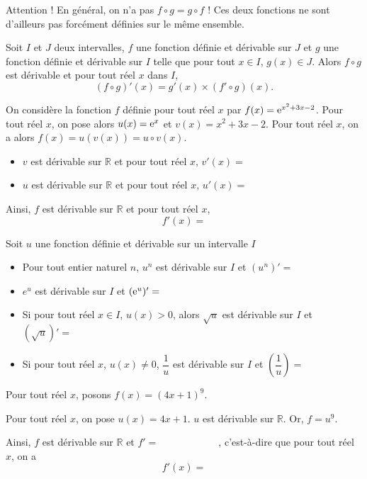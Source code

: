 \documentclass[11pt,fleqn, openany]{book} %
\begin{document}
Attention ! En général, on n'a pas $f \circ g = g \circ f$ ! Ces deux fonctions ne sont d'ailleurs pas forcément définies sur le même ensemble.

\begin{proposition}Soit $I$ et $J$ deux intervalles, $f$ une fonction définie et dérivable sur $J$ et $g$ une fonction définie et dérivable sur $I$ telle que pour tout $x \in I$, $g(x) \in J$. Alors $f \circ g$ est dérivable et pour tout réel $x$ dans $I$,
\[ (f \circ g)' (x)= g'(x) \times (f' \circ g)(x).\]
\vspace{-0.5cm}\end{proposition}



\begin{example}On considère la fonction $f$ définie pour tout réel $x$ par $f(x)=\mathrm{e}^{x^2+3x-2}$. 
Pour tout réel $x$, on pose alors $u(x)=\mathrm{e}^x$ et $v(x)=x^2+3x-2$. Pour tout réel $x$, on a alors  $f(x)= u(v(x)) = u \circ v (x)$.

\begin{itemize}
\item $v$ est dérivable sur $\mathbb{R}$ et pour tout réel $x$, $v'(x)=$
\item $u$ est dérivable sur $\mathbb{R}$ et pour tout réel $x$, $u'(x)=$
\end{itemize}
Ainsi, $f$ est dérivable sur $\mathbb{R}$ et pour tout réel $x$, 
\[ f'(x)=\]\end{example}
\begin{proposition} Soit $u$ une fonction définie et dérivable sur un intervalle $I$
\begin{itemize}
\item Pour tout entier naturel $n$, $u^n$ est dérivable sur $I$ et $(u^n)'=$
\vskip10pt
\item $e^u$ est dérivable sur $I$ et $(\mathrm{e}^u)'=$
\vskip10pt
\item Si pour tout réel $x\in I$, $u(x)>0$, alors $\sqrt{u}$ est dérivable sur $I$ et $(\sqrt{u})' =$
\vskip10pt
\item Si pour tout réel $x$, $u(x) \neq 0$, $\dfrac{1}{u}$ est dérivable sur $I$ et $\left(\dfrac{1}{u}\right)=$
\end{itemize}\end{proposition}

\begin{example}Pour tout réel $x$, posons $f(x)=(4x+1)^9$.

Pour tout réel $x$, on pose $u(x)=4x+1$. $u$ est dérivable sur $\mathbb{R}$. Or, $f=u^9$.

 Ainsi, $f$ est dérivable sur $\mathbb{R}$ et $f'=\qquad\qquad\qquad$, c'est-à-dire que pour tout réel $x$, on a
\[ f'(x)= \]\end{example}
\end{document}
